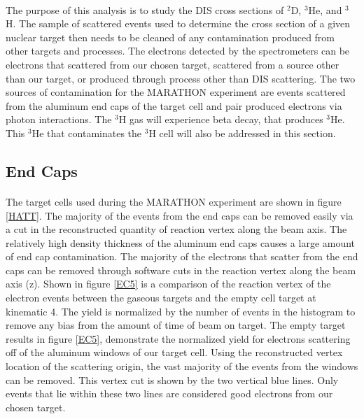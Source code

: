 \paragraph{} The purpose of this analysis is to study the DIS cross sections of $^2$D, $^3$He, and $^3$H. The sample of scattered events used to determine the cross section of a given nuclear target then needs to be cleaned of any contamination produced from other targets and processes. The electrons detected by the spectrometers can be electrons that scattered from our chosen target, scattered from a source other than our target, or produced through process other than DIS scattering. The two sources of contamination for the MARATHON experiment are events scattered from the aluminum end caps of the target cell and pair produced electrons via photon interactions. The $^3$H gas will experience beta decay, that produces $^3$He. This $^3$He that contaminates the $^3$H cell will also be addressed in this section.
\subsection{End Caps}\label{sec:ecc}
\paragraph{} The target cells used during the MARATHON experiment are shown in figure \ref{HATT}. The majority of the events from the end caps can be removed easily via a cut in the reconstructed quantity of reaction vertex along the beam axis. The relatively high density thickness of the aluminum end caps causes a large amount of end cap contamination. The majority of the electrons that scatter from the end caps can be removed through software cuts in the reaction vertex along the beam axis (z). Shown in figure \ref{EC5} is a comparison of the reaction vertex of the electron events between the gaseous targets and the empty cell target at kinematic 4. The yield is normalized by the number of events in the histogram to remove any bias from the amount of time of beam on target. The empty target  results in figure \ref{EC5}, demonstrate the normalized yield for electrons scattering off of the aluminum windows of our target cell. Using the reconstructed vertex location of the scattering origin, the vast majority of the events from the windows can be removed. This vertex cut is shown by the two vertical blue lines. Only events that lie within these two lines are considered good electrons from our chosen target. 


